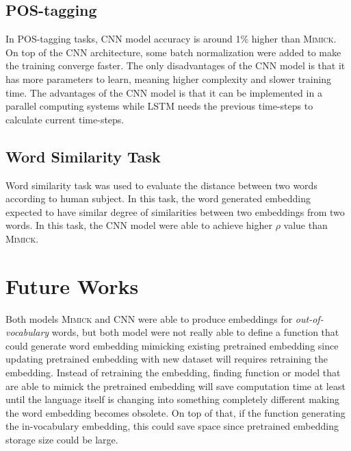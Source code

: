 \subsection{POS-tagging}
In POS-tagging tasks, CNN model accuracy is around 1\% higher than
\textsc{Mimick}. On top of the CNN architecture, some batch
normalization were added to make the training converge faster. The
only disadvantages of the CNN model is that it has more parameters
to learn, meaning higher complexity and slower training time. The
advantages of the CNN model is that it can be implemented in a
parallel computing systems while LSTM needs the previous time-steps to
calculate current time-steps.

\subsection{Word Similarity Task}
Word similarity task was used to evaluate the distance between two
words according to human subject. In this task, the word generated
embedding expected to have similar degree of similarities between two
embeddings from two words. In this task, the CNN model were able to
achieve higher $\rho$ value than \textsc{Mimick}.

\section{Future Works}
Both models \textsc{Mimick} and CNN were able to produce embeddings
for \textit{out-of-vocabulary} words, but both model were not really
able to define a function that could generate word embedding mimicking
existing pretrained embedding since updating pretrained embedding with
new dataset will requires retraining the embedding. Instead of
retraining the embedding, finding function or model that are able to
mimick the pretrained embedding will save computation time at least
until the language itself is changing into something completely
different making the word embedding becomes obsolete. On top of that,
if the function generating the in-vocabulary embedding, this could
save space since pretrained embedding storage size could be large.